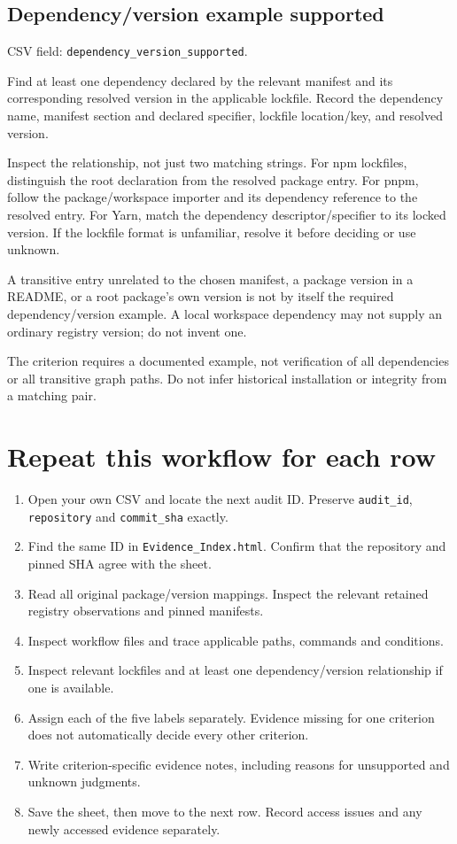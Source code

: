 \documentclass[11pt,a4paper]{article}
\begin{document}
\subsection{Dependency/version example supported}


CSV field: \nolinkurl{dependency_version_supported}.


Find at least one dependency declared by the relevant manifest and its corresponding resolved version in the applicable lockfile. Record the dependency name, manifest section and declared specifier, lockfile location/key, and resolved version.


Inspect the relationship, not just two matching strings. For npm lockfiles, distinguish the root declaration from the resolved package entry. For pnpm, follow the package/workspace importer and its dependency reference to the resolved entry. For Yarn, match the dependency descriptor/specifier to its locked version. If the lockfile format is unfamiliar, resolve it before deciding or use unknown.


A transitive entry unrelated to the chosen manifest, a package version in a README, or a root package's own version is not by itself the required dependency/version example. A local workspace dependency may not supply an ordinary registry version; do not invent one.


The criterion requires a documented example, not verification of all dependencies or all transitive graph paths. Do not infer historical installation or integrity from a matching pair.


\section{Repeat this workflow for each row}


\begin{enumerate}
\item Open your own CSV and locate the next audit ID. Preserve \nolinkurl{audit_id}, \nolinkurl{repository} and \nolinkurl{commit_sha} exactly.
\item Find the same ID in \nolinkurl{Evidence_Index.html}. Confirm that the repository and pinned SHA agree with the sheet.
\item Read all original package/version mappings. Inspect the relevant retained registry observations and pinned manifests.
\item Inspect workflow files and trace applicable paths, commands and conditions.
\item Inspect relevant lockfiles and at least one dependency/version relationship if one is available.
\item Assign each of the five labels separately. Evidence missing for one criterion does not automatically decide every other criterion.
\item Write criterion-specific evidence notes, including reasons for unsupported and unknown judgments.
\item Save the sheet, then move to the next row. Record access issues and any newly accessed evidence separately.
\end{enumerate}
\end{document}
